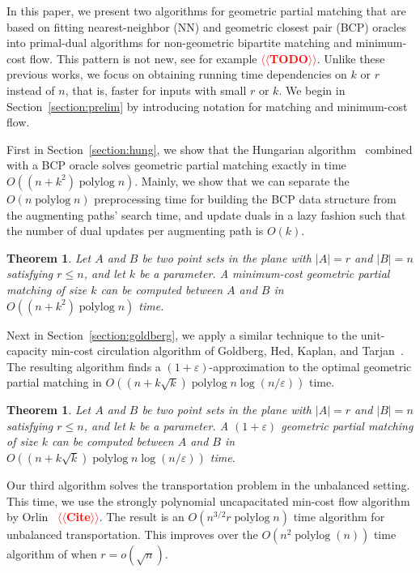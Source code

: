 \documentclass[11pt]{article}
\makeatletter
\def\polylog{\mathop{\mathrm{polylog}}}
\def\eps{\varepsilon}
\theoremstyle{plain}
\newtheorem{theorem}[lemma]{Theorem}
\numberwithin{figure}{section}
\def\n@te#1{\textsf{\boldmath \textbf{$\langle\!\langle$#1$\rangle\!\rangle$}}\leavevmode}
\def\note#1{\textcolor{red}{\n@te{#1}}}
\makeatother
\begin{document}
In this paper, we present two algorithms for geometric partial matching
that are based on fitting nearest-neighbor (NN) and geometric closest pair
(BCP) oracles into primal-dual algorithms for non-geometric bipartite matching
and minimum-cost flow.
This pattern is not new, see for example \note{TODO}.
Unlike these previous works, we focus on obtaining running time dependencies on
$k$ or $r$ instead of $n$, that is, faster for inputs with small $r$ or $k$.
We begin in Section~\ref{section:prelim} by introducing notation for matching
and minimum-cost flow.


First in Section~\ref{section:hung}, we show that the Hungarian algorithm~\cite{Kuhn55}
combined with a BCP oracle solves geometric partial matching exactly in time
$O((n + k^2)\polylog n)$.
Mainly, we show that we can separate the $O(n\polylog n)$ preprocessing time
for building the BCP data structure from the augmenting paths' search time,
and update duals in a lazy fashion such that the number of dual updates per
augmenting path is $O(k)$.

\begin{theorem}
\label{theorem:hung}
Let $A$ and $B$ be two point sets in the plane with $|A| = r$ and $|B| = n$ satisfying $r \le n$, and let $k$ be a
parameter.  A minimum-cost geometric partial matching of size $k$
can be computed between $A$ and $B$ in $O((n + k^2)\polylog n)$ time.
\end{theorem}


Next in Section~\ref{section:goldberg}, we apply a similar technique to the unit-capacity min-cost circulation
algorithm of Goldberg, Hed, Kaplan, and Tarjan~\cite{GHKT17}.
The resulting algorithm finds a $(1 + \eps)$-approximation to the optimal
geometric partial matching in $O((n + k\sqrt{k})\polylog n \log(n/\eps))$
time.

\begin{theorem}
\label{theorem:gmcm}
Let $A$ and $B$ be two point sets in the plane with $|A| = r$ and $|B| = n$ satisfying $r \le n$, and let $k$ be a
parameter.
A $(1+\eps)$ geometric partial matching of size $k$
can be computed between $A$ and $B$ in
$O((n + k\sqrt{k})\polylog n \log(n/\eps))$ time.
\end{theorem}


Our third algorithm solves the transportation problem in the unbalanced
setting.
This time, we use the strongly polynomial uncapacitated min-cost flow algorithm
by Orlin~\cite{xxx} \note{Cite}.
The result is an $O(n^{3/2} r \polylog n)$ time algorithm for unbalanced
transportation.
This improves over the $O(n^2 \polylog(n))$ time algorithm of %
when $r = o(\sqrt{n})$.
\end{document}
